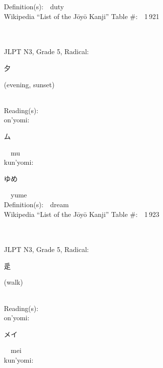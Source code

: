 \begin{multicols}{2}
Definition(s):\ \ duty \\
Wikipedia ``List of the J\=oy\=o Kanji'' Table \#:\ \ 1\,921 \\
\ \ \\
{\fontsize{34pt}{40pt}  }\ \ \\  %
{JLPT N3, Grade 5, Radical:\ \ {\begin{CJK}{UTF8}{min} 夕 \end{CJK}} (evening, sunset) } \\
Reading(s):\ \ \\
{\hspace*{1em}}on'yomi:\ \ \\
{\hspace*{2em}}{\begin{CJK}{UTF8}{min} ム \end{CJK}}\ \ mu\ \ \\
{\hspace*{1em}}kun'yomi:\ \ \\
{\hspace*{2em}}{\begin{CJK}{UTF8}{min} ゆめ \end{CJK}}\ \ yume\ \ \\
Definition(s):\ \ dream \\
Wikipedia ``List of the J\=oy\=o Kanji'' Table \#:\ \ 1\,923 \\
\ \ \\
{\fontsize{34pt}{40pt}  }\ \ \\  %
{JLPT N3, Grade 5, Radical:\ \ {\begin{CJK}{UTF8}{min} 辵 \end{CJK}} (walk) } \\
Reading(s):\ \ \\
{\hspace*{1em}}on'yomi:\ \ \\
{\hspace*{2em}}{\begin{CJK}{UTF8}{min} メイ \end{CJK}}\ \ mei\ \ \\
{\hspace*{1em}}kun'yomi:\ \ \\

\end{multicols}
